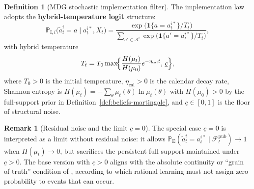 \documentclass[ecta,nameyear,final,supplement]{econsocart}
\numberwithin{equation}{section}
\numberwithin{table}{section}
\theoremstyle{definition}
\newtheorem{definition}[theorem]{Definition}
\newtheorem{remark}[theorem]{Remark}
\newcommand{\ProbE}{\mathbb{P}_{\mathrm{E}}}
\newcommand{\ProbI}[1]{\mathbb{P}_{\mathrm{I},#1}}
\begin{document}
\begin{definition}[MDG stochastic implementation filter]
The implementation law adopts the \textbf{hybrid-temperature logit}
structure:
\begin{equation}
\label{eq:logit-hybrid}
\ProbI{i}\bigl(\tilde{a}_t^i=a\mid a_t^{i\ast},X_t\bigr)
=\frac{\exp\bigl(\mathbf{1}\{a=a_t^{i\ast}\}/T_t\bigr)}
      {\sum_{a'\in\mathcal{A}^i}\exp\bigl(\mathbf{1}\{a'=a_t^{i\ast}\}/T_t\bigr)},
\end{equation}
with hybrid temperature
\begin{equation}
\label{eq:temperatura-piso}
T_t = T_0\max\!\Bigl\{\frac{H(\mu_t)}{H(\mu_0)}e^{-\eta_{\mathrm{cal}}t},\,\underline{c}\Bigr\},
\end{equation}
where $T_0>0$ is the initial temperature, $\eta_{\mathrm{cal}}>0$ is the
calendar decay rate, Shannon entropy is
$H(\mu_t)=-\sum_\theta\mu_t(\theta)\ln\mu_t(\theta)$ with
$H(\mu_0)>0$ by the full-support prior in
Definition~\ref{def:beliefs-martingale}, and
$\underline{c}\in[0,1]$ is the floor of structural noise.
\end{definition}

\begin{remark}[Residual noise and the limit $\underline{c}=0$]
\label{rem:mdg-floor}
The special case $\underline{c}=0$ is interpreted as a limit without residual
noise: it allows
$\ProbE(\tilde{a}_t^i=a_t^{i\ast}\mid\mathcal{F}_t^{\mathrm{pub}})\to 1$
when $H(\mu_t)\to 0$, but sacrifices the persistent full support maintained
under $\underline{c}>0$. The base version with $\underline{c}>0$ aligns with
the absolute continuity or ``grain of truth'' condition of
\citet{KalaiLehrer1993}, according to which rational learning must not assign
zero probability to events that can occur.
\end{remark}
\end{document}
